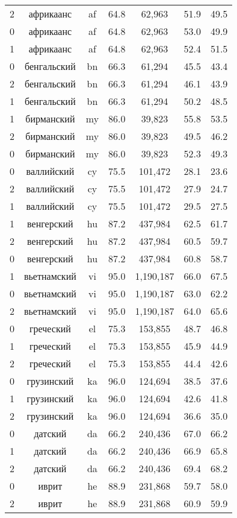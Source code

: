 \begin{table*}
{\begin{tabular}{|c|c|c|c||c|c|c|}
2 & африкаанс & af & 64.8 & 62,963 & 51.9 & 49.5\\
0 & африкаанс & af & 64.8 & 62,963 & 53.0 & 49.9\\
1 & африкаанс & af & 64.8 & 62,963 & 52.4 & 51.5\\
0 & бенгальский & bn & 66.3 & 61,294 & 45.5 & 43.4\\
2 & бенгальский & bn & 66.3 & 61,294 & 46.1 & 43.9\\
1 & бенгальский & bn & 66.3 & 61,294 & 50.2 & 48.5\\
1 & бирманский & my & 86.0 & 39,823 & 55.8 & 53.5\\
2 & бирманский & my & 86.0 & 39,823 & 49.5 & 46.2\\
0 & бирманский & my & 86.0 & 39,823 & 52.3 & 49.3\\
0 & валлийский & cy & 75.5 & 101,472 & 28.1 & 23.6\\
2 & валлийский & cy & 75.5 & 101,472 & 27.9 & 24.7\\
1 & валлийский & cy & 75.5 & 101,472 & 29.5 & 27.5\\
1 & венгерский & hu & 87.2 & 437,984 & 62.5 & 61.7\\
2 & венгерский & hu & 87.2 & 437,984 & 60.5 & 59.7\\
0 & венгерский & hu & 87.2 & 437,984 & 60.8 & 58.7\\
1 & вьетнамский & vi & 95.0 & 1,190,187 & 66.0 & 67.5\\
0 & вьетнамский & vi & 95.0 & 1,190,187 & 63.0 & 62.2\\
2 & вьетнамский & vi & 95.0 & 1,190,187 & 64.0 & 65.6\\
0 & греческий & el & 75.3 & 153,855 & 48.7 & 46.8\\
1 & греческий & el & 75.3 & 153,855 & 45.9 & 44.9\\
2 & греческий & el & 75.3 & 153,855 & 44.4 & 42.6\\
0 & грузинский & ka & 96.0 & 124,694 & 38.5 & 37.6\\
1 & грузинский & ka & 96.0 & 124,694 & 42.6 & 41.8\\
2 & грузинский & ka & 96.0 & 124,694 & 36.6 & 35.0\\
0 & датский & da & 66.2 & 240,436 & 67.0 & 66.2\\
1 & датский & da & 66.2 & 240,436 & 66.9 & 65.8\\
2 & датский & da & 66.2 & 240,436 & 69.4 & 68.2\\
0 & иврит & he & 88.9 & 231,868 & 59.7 & 58.0\\
2 & иврит & he & 88.9 & 231,868 & 60.9 & 59.9\\

\end{tabular}}
\end{table*}
